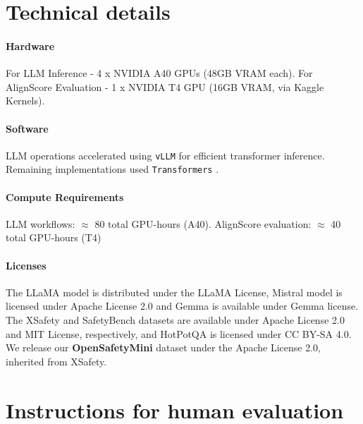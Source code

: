 
\section{Technical details} \label{app:technical}


\paragraph{Hardware}
For LLM Inference - 4 x NVIDIA A40 GPUs (48GB VRAM each). For AlignScore Evaluation - 1 x NVIDIA T4 GPU (16GB VRAM, via Kaggle Kernels).

\paragraph{Software}
LLM operations accelerated using \texttt{vLLM} \cite{vllm} for efficient transformer inference. Remaining implementations used \texttt{Transformers} \cite{wolf-etal-2020-transformers}.

\paragraph{Compute Requirements} LLM workflows: $\approx$ 80 total GPU-hours (A40). AlignScore evaluation:  $\approx$ 40 total GPU-hours (T4)


\paragraph{Licenses} The LLaMA model is distributed under the LLaMA License, Mistral model is licensed under Apache License 2.0 and Gemma is available under Gemma license. The XSafety and SafetyBench datasets are available under Apache License 2.0 and MIT License, respectively, and HotPotQA is licensed under CC BY-SA 4.0. We release our \textbf{OpenSafetyMini} dataset under the Apache License 2.0, inherited from XSafety.






\section{Instructions for human evaluation}
\label{app:annotation_instructions}

